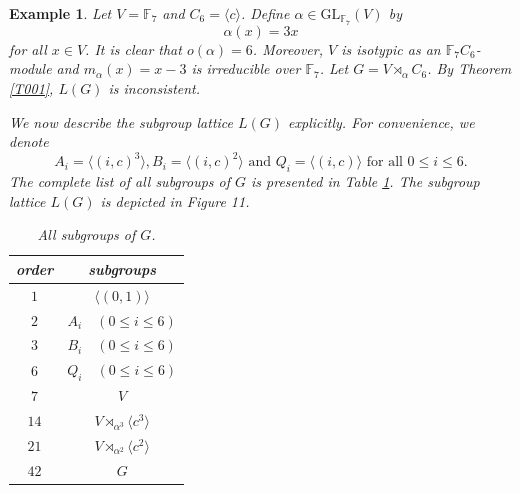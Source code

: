 \documentclass[12pt]{article}
\newtheorem{example}{\bf Example}[section]
\begin{document}
\begin{example}\label{example002}
\emph{Let $V=\mathbb{F}_{7}$ and $C_6=\langle c\rangle$. Define $\alpha\in \mbox{GL}_{\mathbb{F}_{7}}(V)$ by $$\alpha(x)=3x$$ for all $x\in V$.
It is clear that $o(\alpha)=6$. Moreover, $V$ is isotypic as 
an $\mathbb{F}_7C_6$-module and $m_{\alpha}(x)=x-3$ is irreducible over $\mathbb{F}_{7}$. 
Let $G=V\rtimes_{\alpha} C_6$.  By Theorem \ref{T001}, $L(G)$ is inconsistent.}

\emph{We now describe the subgroup lattice $L(G)$ explicitly. For convenience, we denote $$A_i=\langle (i,c)^3\rangle, B_i=\langle (i,c)^2\rangle \mbox{ and } Q_i=\langle (i, c)\rangle \mbox{ for all } 0\leq i\leq 6.$$ 
The complete list of all subgroups of $G$ is presented in Table \ref{Tab:02}. The subgroup lattice $L(G)$ is depicted in Figure 11.}
\begin{table}[!h]
\centering
\caption{All subgroups of $G$.}
\label{Tab:02}
\begin{tabular}{c|c}
order & subgroups \\
 \hline
 $1$ & $\langle (0,1)\rangle$ \\
 $2$ & $A_i \quad (0\leq i\leq 6)$  \\
 $3$ & $B_i \quad (0\leq i\leq 6)$ \\
 $6$ & $Q_i \quad (0\leq i\leq 6)$  \\
 $7$ & $V$  \\
 $14$ & $V\rtimes_{\alpha^3} \langle c^3\rangle$ \\
 $21$ & $V\rtimes_{\alpha^2} \langle c^2\rangle$ \\
 $42$ & $G$ \\
 \end{tabular}
\end{table}



\end{example}
\end{document}
